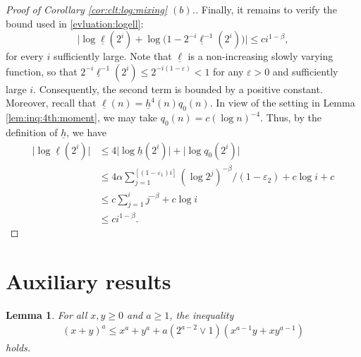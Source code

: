 \documentclass[11pt,a4,leqno]{amsart}
\newtheorem{lemma}{Lemma}[section]
\newcommand{\ud}{\underline}
\newcommand{\vep}{\varepsilon}
\newcommand{\1}{{\mathbf 1}}
\begin{document}
\begin{proof}[Proof of Corollary \ref{cor:clt:log:mixing} $(b)$.]
Finally, it remains to verify the bound used in \eqref{evluation:logell}: 
\[
    \big|\log \ud \ell(2^i) + \log \big(1-2^{-i}\ud \ell^{-1}(2^i)\big)\big| \le c i^{1-\beta},
\]
for every $i$ sufficiently large. Note that $\ud \ell$ is a non-increasing slowly varying function, so that 
$2^{-i} \ud \ell^{-1}(2^i) \le 2^{-i(1-\vep)} < 1$ for any $\vep > 0$ and sufficiently large $i$. Consequently, the second term is bounded by a positive constant. Moreover, recall that $\ud \ell(n) = \ud h^4(n)q_0(n)$. In view of the setting in Lemma \ref{lem:inq:4th:moment}, we may take $q_0(n) = c (\log n)^{-4}$. Thus, by the definition of $\ud h$, we have 
\begin{align*}
    \big|\log \ud \ell (2^i)\big| &\le 4 \big|\log \ud h(2^i) \big| + \big| \log q_0(2^i) \big| \\
    &\le 4\alpha \sum_{j=1}^{[(1-\vep_1)i]} (\log 2^j)^{-\beta}/(1-\vep_2) + c\log i + c \\
    &\le c \sum_{j=1}^i j^{-\beta} + c\log i \\
    &\le c i^{1-\beta}. 
\end{align*}
\end{proof}

\appendix
\section{Auxiliary results}
\label{appendix}
\begin{lemma}
\label{aux:lem:ineq}
For all $x,y\ge 0$ and $a\ge 1$, the inequality
\begin{align*}
(x+y)^a \le x^a +y^a +a (2^{a-2}\vee 1) (x^{a-1}y +xy^{a-1})
\end{align*}
holds. 
\end{lemma}
\end{document}
